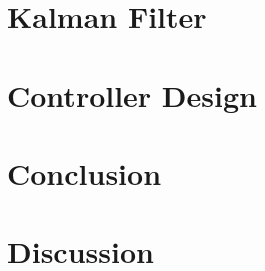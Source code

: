 \documentclass[a4paper]{article}
\begin{document}
\section{Kalman Filter}
% 
% 

\section{Controller Design}




\section{Conclusion}

\section{Discussion}






\end{document}
